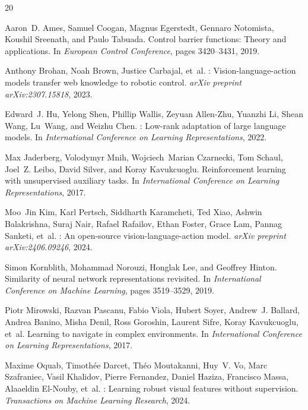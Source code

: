 \documentclass[letterpaper]{article}
\begin{document}
\begin{thebibliography}{20}

Aaron~D. Ames, Samuel Coogan, Magnus Egerstedt, Gennaro Notomista, Koushil Sreenath, and Paulo Tabuada.
\newblock Control barrier functions: Theory and applications.
\newblock In \emph{European Control Conference}, pages 3420--3431, 2019.

Anthony Brohan, Noah Brown, Justice Carbajal, et~al.
: Vision-language-action models transfer web knowledge to robotic control.
\newblock \emph{arXiv preprint arXiv:2307.15818}, 2023.

Edward~J. Hu, Yelong Shen, Phillip Wallis, Zeyuan Allen-Zhu, Yuanzhi Li, Shean Wang, Lu~Wang, and Weizhu Chen.
: Low-rank adaptation of large language models.
\newblock In \emph{International Conference on Learning Representations}, 2022.

Max Jaderberg, Volodymyr Mnih, Wojciech~Marian Czarnecki, Tom Schaul, Joel~Z. Leibo, David Silver, and Koray Kavukcuoglu.
\newblock Reinforcement learning with unsupervised auxiliary tasks.
\newblock In \emph{International Conference on Learning Representations}, 2017.

Moo~Jin Kim, Karl Pertsch, Siddharth Karamcheti, Ted Xiao, Ashwin Balakrishna, Suraj Nair, Rafael Rafailov, Ethan Foster, Grace Lam, Pannag Sanketi, et~al.
: An open-source vision-language-action model.
\newblock \emph{arXiv preprint arXiv:2406.09246}, 2024.

Simon Kornblith, Mohammad Norouzi, Honglak Lee, and Geoffrey Hinton.
\newblock Similarity of neural network representations revisited.
\newblock In \emph{International Conference on Machine Learning}, pages 3519--3529, 2019.

Piotr Mirowski, Razvan Pascanu, Fabio Viola, Hubert Soyer, Andrew~J. Ballard, Andrea Banino, Misha Denil, Ross Goroshin, Laurent Sifre, Koray Kavukcuoglu, et~al.
\newblock Learning to navigate in complex environments.
\newblock In \emph{International Conference on Learning Representations}, 2017.

Maxime Oquab, Timoth{\'e}e Darcet, Th{\'e}o Moutakanni, Huy~V. Vo, Marc Szafraniec, Vasil Khalidov, Pierre Fernandez, Daniel Haziza, Francisco Massa, Alaaeldin El-Nouby, et~al.
: Learning robust visual features without supervision.
\newblock \emph{Transactions on Machine Learning Research}, 2024.


\end{thebibliography}
\end{document}
